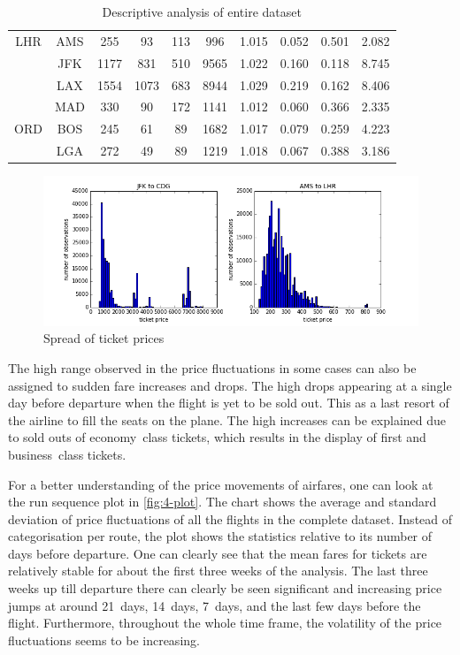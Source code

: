 \begin{table}
\begin{tabular}{c c | c c c c | c c c c}
LHR  &  AMS  &   255  &    93  &   113  &   996  &  1.015  &  0.052  &  0.501  &  2.082  \\
~    &  JFK  &  1177  &   831  &   510  &  9565  &  1.022  &  0.160  &  0.118  &  8.745  \\
~    &  LAX  &  1554  &  1073  &   683  &  8944  &  1.029  &  0.219  &  0.162  &  8.406  \\
~    &  MAD  &   330  &    90  &   172  &  1141  &  1.012  &  0.060  &  0.366  &  2.335  \\[.5ex]
ORD  &  BOS  &   245  &    61  &    89  &  1682  &  1.017  &  0.079  &  0.259  &  4.223  \\
~    &  LGA  &   272  &    49  &    89  &  1219  &  1.018  &  0.067  &  0.388  &  3.186  \\
\bottomrule
\end{tabular}
\caption{Descriptive analysis of entire dataset}
\label{tbl:DescriptiveAnalysisEntireDataset}
\end{table}


\begin{figure}
\centering
\includegraphics[width=.8\textwidth]{figures/Spread_JFK-CDG}
\caption{Spread of ticket prices}
\label{fig:SpreadOfTicketPrices}
\end{figure}


The high range observed in the price fluctuations in some cases can also be assigned to sudden fare increases and drops. The high drops appearing at a single day before departure when the flight is yet to be sold out. This as a last resort of the airline to fill the seats on the plane. The high increases can be explained due to sold outs of economy~class tickets, which results in the display of first and business~class tickets.

For a better understanding of the price movements of airfares, one can look at the run sequence plot in \autoref{fig:4-plot}. The chart shows the average and standard deviation of price fluctuations of all the flights in the complete dataset. Instead of categorisation per route, the plot shows the statistics relative to its number of days before departure. One can clearly see that the mean fares for tickets are relatively stable for about the first three weeks of the analysis. The last three weeks up till departure there can clearly be seen significant and increasing price jumps at around 21~days, 14~days, 7~days, and the last few days before the flight. Furthermore, throughout the whole time frame, the volatility of the price fluctuations seems to be increasing.


